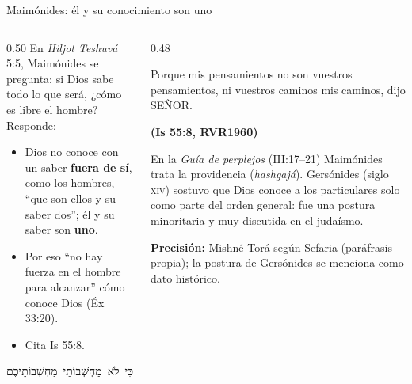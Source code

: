 \documentclass[hyperref={bookmarks=false},aspectratio=169]{beamer}
\newcommand{\heb}[1]{\mbox{\foreignlanguage{hebrew}{#1}}}
\newcommand{\SENOR}{S{\fontsize{0.78em}{1em}\selectfont EÑOR}}
\newcommand{\fuente}[1]{\par\hfill{\upshape\bfseries\footnotesize\textcolor{azul}{#1}}}
\newcommand{\destacar}[1]{\textbf{\textcolor{azul}{#1}}}
\newcommand{\precision}[1]{{\footnotesize\color{gris}\textbf{Precisión:} #1}}
\begin{document}
\begin{frame}{Maimónides: él y su conocimiento son uno}
\begin{columns}[t,onlytextwidth]
\begin{column}{0.50\textwidth}\small
En \emph{Hiljot Teshuvá} 5:5, Maimónides se pregunta: si Dios sabe todo lo que será, ¿cómo es libre el hombre? Responde:
\begin{itemize}
\item Dios no conoce con un saber \destacar{fuera de sí}, como los hombres, ``que son ellos y su saber dos''; él y su saber son \destacar{uno}.
\item Por eso ``no hay fuerza en el hombre para alcanzar'' cómo conoce Dios (Éx 33:20).
\item Cita Is 55:8.
\end{itemize}
\begin{center}\heb{כִּי לֹא מַחְשְׁבוֹתַי מַחְשְׁבוֹתֵיכֶם}\end{center}
\end{column}
\begin{column}{0.48\textwidth}
\begin{cita}Porque mis pensamientos no son vuestros pensamientos, ni vuestros caminos mis caminos, dijo \SENOR{}.\fuente{(Is 55:8, RVR1960)}\end{cita}
\scriptsize En la \emph{Guía de perplejos} (III:17--21) Maimónides trata la providencia (\emph{hashgajá}). Gersónides (siglo \textsc{xiv}) sostuvo que Dios conoce a los particulares solo como parte del orden general: fue una postura minoritaria y muy discutida en el judaísmo.\par\smallskip
\precision{Mishné Torá según Sefaria (paráfrasis propia); la postura de Gersónides se menciona como dato histórico.}
\end{column}
\end{columns}
\end{frame}
\end{document}
